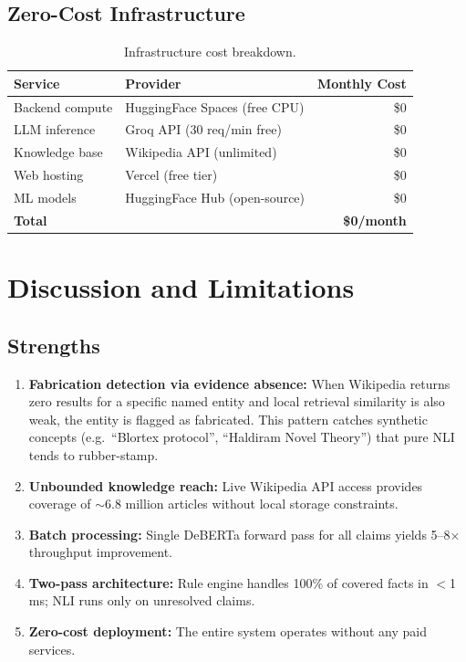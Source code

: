 \documentclass[12pt, a4paper, oneside]{report}
\begin{document}
\section{Zero-Cost Infrastructure}

\begin{table}[H]
\centering
\caption{Infrastructure cost breakdown.}
\label{tab:cost}
\begin{tabular}{l l r}
\toprule
\textbf{Service} & \textbf{Provider} & \textbf{Monthly Cost} \\
\midrule
Backend compute & HuggingFace Spaces (free CPU) & \$0 \\
LLM inference & Groq API (30 req/min free) & \$0 \\
Knowledge base & Wikipedia API (unlimited) & \$0 \\
Web hosting & Vercel (free tier) & \$0 \\
ML models & HuggingFace Hub (open-source) & \$0 \\
\midrule
\textbf{Total} & & \textbf{\$0/month} \\
\bottomrule
\end{tabular}
\end{table}

\chapter{Discussion and Limitations}
\label{ch:discussion}

\section{Strengths}

\begin{enumerate}[nosep]
    \item \textbf{Fabrication detection via evidence absence:} When Wikipedia returns zero results for a specific named entity and local retrieval similarity is also weak, the entity is flagged as fabricated. This pattern catches synthetic concepts (e.g.\ ``Blortex protocol'', ``Haldiram Novel Theory'') that pure NLI tends to rubber-stamp.
    \item \textbf{Unbounded knowledge reach:} Live Wikipedia API access provides coverage of $\sim$6.8 million articles without local storage constraints.
    \item \textbf{Batch processing:} Single DeBERTa forward pass for all claims yields 5--8$\times$ throughput improvement.
    \item \textbf{Two-pass architecture:} Rule engine handles 100\% of covered facts in $<$1\,ms; NLI runs only on unresolved claims.
    \item \textbf{Zero-cost deployment:} The entire system operates without any paid services.
\end{enumerate}
\end{document}
